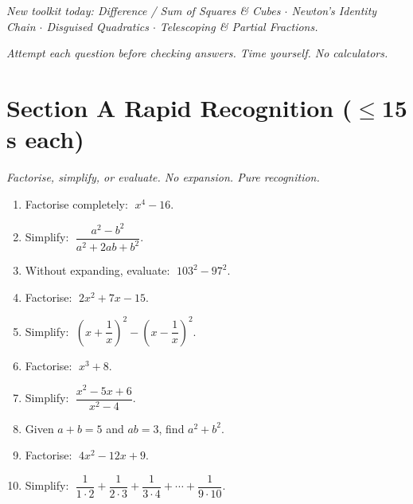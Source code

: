\documentclass[11pt,a4paper]{article}
\begin{document}
\noindent\textit{New toolkit today: Difference / Sum of Squares \& Cubes $\cdot$ Newton's Identity Chain $\cdot$ Disguised Quadratics $\cdot$ Telescoping \& Partial Fractions.}

\vspace{2pt}
\noindent\textit{Attempt each question before checking answers. Time yourself. No calculators.}

\section*{Section A \quad Rapid Recognition \hfill{\normalfont\small($\leq$15 s each)}}

\noindent\textit{Factorise, simplify, or evaluate. No expansion. Pure recognition.}

\begin{enumerate}

\item Factorise completely: $\;x^4 - 16$.

\item Simplify: $\;\dfrac{a^2 - b^2}{a^2 + 2ab + b^2}$.

\item Without expanding, evaluate: $\;103^2 - 97^2$.

\item Factorise: $\;2x^2 + 7x - 15$.

\item Simplify: $\;\left(x + \dfrac{1}{x}\right)^2 - \left(x - \dfrac{1}{x}\right)^2$.

\item Factorise: $\;x^3 + 8$.

\item Simplify: $\;\dfrac{x^2 - 5x + 6}{x^2 - 4}$.

\item Given $a + b = 5$ and $ab = 3$, find $a^2 + b^2$.

\item Factorise: $\;4x^2 - 12x + 9$.

\item Simplify: $\;\dfrac{1}{1\cdot2}+\dfrac{1}{2\cdot3}+\dfrac{1}{3\cdot4}+\cdots+\dfrac{1}{9\cdot10}$.

\end{enumerate}
\end{document}
